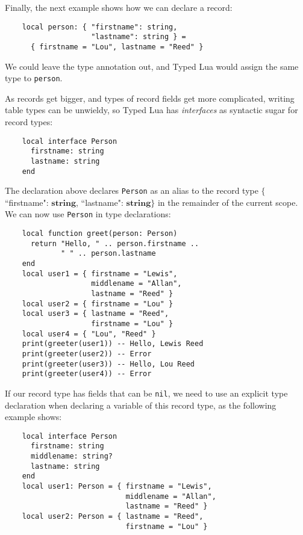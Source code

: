 \documentclass{sig-alternate}
\newcommand{\String}{\mathbf{string}}
\begin{document}
Finally, the next example shows how we can declare a record:

\begin{verbatim}
    local person: { "firstname": string,
                    "lastname": string } =
      { firstname = "Lou", lastname = "Reed" } 
\end{verbatim}

We could leave the type annotation out, and Typed Lua would
assign the same type to {\tt person}.

As records get bigger, and types of record fields get more
complicated, writing table types can be unwieldy, so Typed
Lua has {\em interfaces} as syntactic sugar for record types:

\begin{verbatim}
    local interface Person
      firstname: string
      lastname: string
    end
\end{verbatim}

The declaration above declares {\tt Person} as an alias to
the record type $\{$``firstname": $\String$,
 ``lastname": $\String\}$ in
the remainder of the current scope. We can now use {\tt Person} in
type declarations:

\begin{verbatim}
    local function greet(person: Person)
      return "Hello, " .. person.firstname ..
             " " .. person.lastname
    end
    local user1 = { firstname = "Lewis",
                    middlename = "Allan",
                    lastname = "Reed" }
    local user2 = { firstname = "Lou" }
    local user3 = { lastname = "Reed",
                    firstname = "Lou" }
    local user4 = { "Lou", "Reed" }
    print(greeter(user1)) -- Hello, Lewis Reed
    print(greeter(user2)) -- Error
    print(greeter(user3)) -- Hello, Lou Reed
    print(greeter(user4)) -- Error
\end{verbatim}

If our record type has fields that can be {\tt nil}, we need
to use an explicit type declaration when declaring a
variable of this record type, as the following example shows:

\begin{verbatim}
    local interface Person
      firstname: string
      middlename: string?
      lastname: string
    end
    local user1: Person = { firstname = "Lewis",
                            middlename = "Allan",
                            lastname = "Reed" }
    local user2: Person = { lastname = "Reed",
                            firstname = "Lou" }
\end{verbatim}
\end{document}
